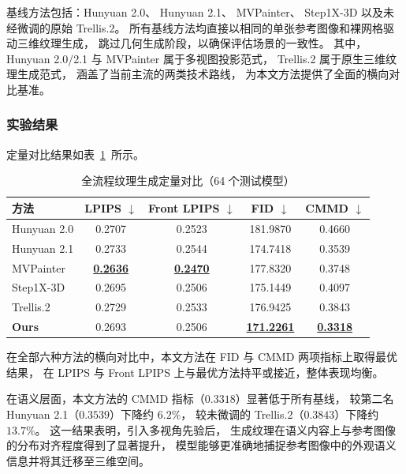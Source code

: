 基线方法包括：Hunyuan 2.0\cite{zhao2025hunyuan3d}、
Hunyuan 2.1\cite{lai2025hunyuan3d}、
MVPainter\cite{shao2025mvpainter}、
Step1X-3D\cite{li2025step1x}
以及未经微调的原始 Trellis.2\cite{xiang2025native}。
所有基线方法均直接以相同的单张参考图像和裸网格驱动三维纹理生成，
跳过几何生成阶段，以确保评估场景的一致性。
其中，Hunyuan 2.0/2.1 与 MVPainter 属于多视图投影范式，
Trellis.2 属于原生三维纹理生成范式，
涵盖了当前主流的两类技术路线，
为本文方法提供了全面的横向对比基准。

\subsubsection{实验结果}

定量对比结果如表~\ref{tab:full_pipeline}~所示。

\begin{table}[htbp]
    \centering
    \caption{全流程纹理生成定量对比（64 个测试模型）}
    \label{tab:full_pipeline}
    \begin{tabular}{lcccc}
        \toprule
        方法 & LPIPS $\downarrow$ & Front LPIPS $\downarrow$ & FID $\downarrow$ & CMMD $\downarrow$ \\
        \midrule
        Hunyuan 2.0     & 0.2707 & 0.2523 & 181.9870 & 0.4660 \\
        Hunyuan 2.1     & 0.2733 & 0.2544 & 174.7418 & 0.3539 \\
        MVPainter       & \textbf{\underline{0.2636}} & \textbf{\underline{0.2470}} & 177.8320 & 0.3748 \\
        Step1X-3D       & 0.2695 & 0.2506 & 175.1449 & 0.4097 \\
        Trellis.2       & 0.2729 & 0.2533 & 176.9425 & 0.3843 \\
        \textbf{Ours}   & 0.2693 & 0.2506 & \textbf{\underline{171.2261}} & \textbf{\underline{0.3318}} \\
        \bottomrule
    \end{tabular}
\end{table}

在全部六种方法的横向对比中，本文方法在 FID 与 CMMD 两项指标上取得最优结果，
在 LPIPS 与 Front LPIPS 上与最优方法持平或接近，整体表现均衡。

在语义层面，本文方法的 CMMD 指标（$0.3318$）显著低于所有基线，
较第二名 Hunyuan 2.1（$0.3539$）下降约 $6.2\%$，
较未微调的 Trellis.2（$0.3843$）下降约 $13.7\%$。
这一结果表明，引入多视角先验后，
生成纹理在语义内容上与参考图像的分布对齐程度得到了显著提升，
模型能够更准确地捕捉参考图像中的外观语义信息并将其迁移至三维空间。

